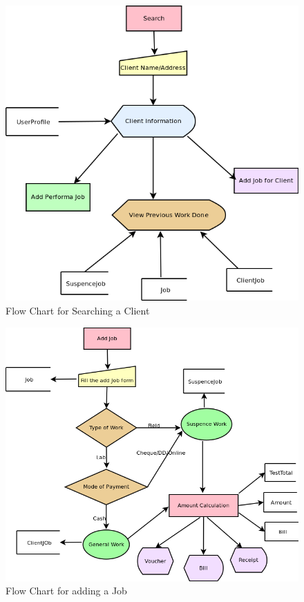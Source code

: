 \begin{figure}[h]

\centering \includegraphics[scale=0.7]{search.png}
\caption{Flow Chart for Searching a Client}
\end{figure}

\newpage
\begin{figure}[h]
\centering \includegraphics[scale=0.7]{addjob.png}
\caption{Flow Chart for adding a Job}
\end{figure}

